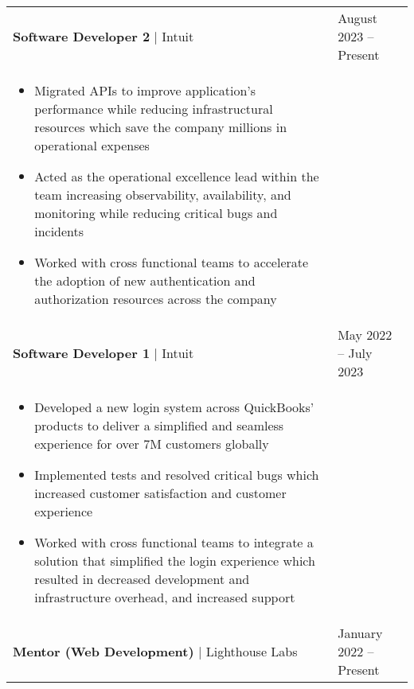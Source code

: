 \documentclass[11pt]{article}
\newenvironment{compactList}
{
  \begin{itemize}
    \setlength{\itemsep}{0pt}
    \setlength{\parskip}{0pt}
}
{\end{itemize}}
\begin{document}
\begin{tabularx}{\textwidth\setlength{\extrarowheight}{5pt}}
  {
    >{\hsize=1.5\hsize\raggedright\arraybackslash}X
    >{\hsize=0.5\hsize\raggedleft\arraybackslash}X
  }
  \textbf{Software Developer 2} $\vert$ Intuit                            & August 2023 – Present     \\
  \multicolumn{2}{>{\hsize=\dimexpr2\hsize+2\tabcolsep+\arrayrulewidth\relax}X}
  {
    \begin{minipage}{0.85\paperwidth}
      \begin{compactList}
        \item Migrated APIs to improve application's performance while reducing infrastructural resources which save the company millions in operational expenses
        \item Acted as the operational excellence lead within the team increasing observability, availability, and monitoring while reducing critical bugs and incidents
        \item Worked with cross functional teams to accelerate the adoption of new authentication and authorization resources across the company
      \end{compactList}
    \end{minipage}
  }
  \\
  \textbf{Software Developer 1} $\vert$ Intuit                            & May 2022 – July 2023     \\
  \multicolumn{2}{>{\hsize=\dimexpr2\hsize+2\tabcolsep+\arrayrulewidth\relax}X}
  {
    \begin{minipage}{0.85\paperwidth}
      \begin{compactList}
        \item Developed a new login system across QuickBooks' products to deliver a simplified and seamless experience for over 7M customers globally
        \item Implemented tests and resolved critical bugs which increased customer satisfaction and customer experience
        \item Worked with cross functional teams to integrate a solution that simplified the login experience which resulted in decreased development and infrastructure overhead, and increased support
      \end{compactList}
    \end{minipage}
  }
  \\
  \textbf{Mentor (Web Development)} $\vert$ Lighthouse Labs               & January 2022 – Present \\

\end{tabularx}
\end{document}
